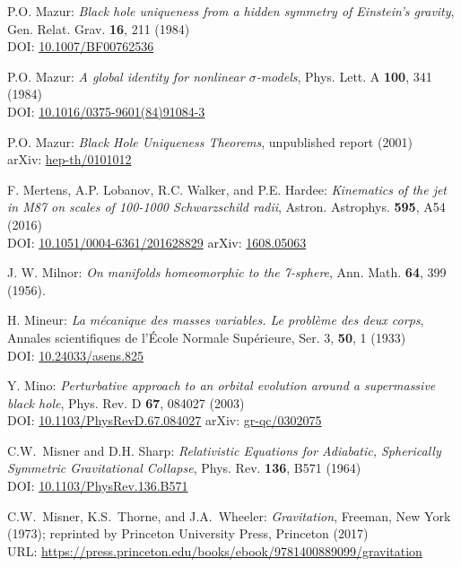 \begin{thebibliography}{123}
P.O. Mazur:
{\em Black hole uniqueness from a hidden symmetry of Einstein's gravity},
Gen. Relat. Grav. {\bf 16}, 211 (1984)\\
DOI: \href{https://doi.org/10.1007/BF00762536}{10.1007/BF00762536}

P.O. Mazur:
{\em A global identity for nonlinear $\sigma$-models},
Phys. Lett. A {\bf 100}, 341 (1984)\\
DOI: \href{https://doi.org/10.1016/0375-9601(84)91084-3}{10.1016/0375-9601(84)91084-3}

P.O. Mazur:
{\em Black Hole Uniqueness Theorems},
unpublished report (2001)\\
arXiv: \href{https://arxiv.org/abs/hep-th/0101012}{hep-th/0101012}

F. Mertens, A.P. Lobanov, R.C. Walker, and P.E. Hardee:
{\em Kinematics of the jet in M87 on scales of 100-1000 Schwarzschild radii},
Astron. Astrophys. {\bf 595}, A54 (2016)\\
DOI: \href{https://doi.org/10.1051/0004-6361/201628829}{10.1051/0004-6361/201628829}\hfill
arXiv: \href{https://arxiv.org/abs/1608.05063}{1608.05063}

J. W. Milnor: {\em On manifolds homeomorphic to the 7-sphere},
Ann. Math. {\bf 64}, 399 (1956).

H. Mineur: {\em La mécanique des masses variables. Le problème des deux corps},
Annales scientifiques de l'École Normale Supérieure, Ser. 3, {\bf 50}, 1 (1933)\\
DOI: \href{https://doi.org/10.24033/asens.825}{10.24033/asens.825}

Y. Mino:
{\em Perturbative approach to an orbital evolution around a supermassive black hole},
Phys. Rev. D {\bf 67}, 084027 (2003)\\
DOI: \href{https://doi.org/10.1103/PhysRevD.67.084027}{10.1103/PhysRevD.67.084027}\hfill
arXiv: \href{https://arxiv.org/abs/gr-qc/0302075}{gr-qc/0302075}

C.W.~Misner and D.H. Sharp:
{\em Relativistic Equations for Adiabatic, Spherically Symmetric Gravitational Collapse},
Phys. Rev. {\bf 136}, B571 (1964)\\
DOI: \href{https://doi.org/10.1103/PhysRev.136.B571}{10.1103/PhysRev.136.B571}

C.W.~Misner, K.S.~Thorne, and J.A.~Wheeler:
{\em Gravitation},
Freeman, New York (1973);
reprinted by Princeton University Press, Princeton (2017)\\
URL: \url{https://press.princeton.edu/books/ebook/9781400889099/gravitation}


\end{thebibliography}
